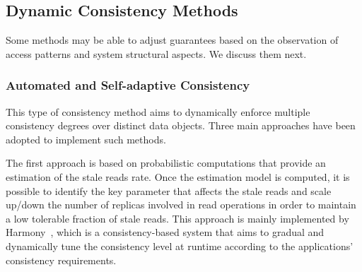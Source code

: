 

\subsection{Dynamic Consistency Methods}

Some methods may be able to adjust guarantees based on the observation of access patterns and {\al system structural aspects. We discuss them next.}

\vspace{2mm}
\subsubsection{Automated and Self-adaptive Consistency}

This type of consistency method aims to dynamically enforce multiple consistency degrees over distinct data objects.  
Three main approaches %
have been adopted to implement such methods. 


The first approach is based on probabilistic computations that provide an estimation of the stale reads rate. Once the estimation model is computed, it is possible to identify the key parameter that affects the stale reads and scale up/down the number of replicas involved in read operations in order to maintain a low tolerable fraction of stale reads. This approach is mainly implemented by Harmony~\cite{chihoub2012harmony}, which is a consistency-based system that aims to gradual and dynamically tune the consistency level at runtime according to the applications' consistency requirements.

